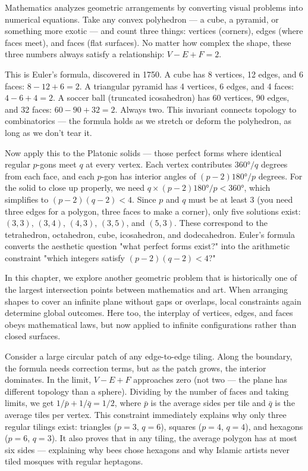 Mathematics analyzes geometric arrangements by converting visual problems into numerical equations. Take any convex polyhedron — a cube, a pyramid, or something more exotic — and count three things: vertices (corners), edges (where faces meet), and faces (flat surfaces). No matter how complex the shape, these three numbers always satisfy a relationship: $V - E + F = 2$.

This is Euler's formula, discovered in 1750. A cube has 8 vertices, 12 edges, and 6 faces: $8 - 12 + 6 = 2$. A triangular pyramid has 4 vertices, 6 edges, and 4 faces: $4 - 6 + 4 = 2$. A soccer ball (truncated icosahedron) has 60 vertices, 90 edges, and 32 faces: $60 - 90 + 32 = 2$. Always two. This invariant connects topology to combinatorics — the formula holds as we stretch or deform the polyhedron, as long as we don't tear it.

Now apply this to the Platonic solids — those perfect forms where identical regular $p$-gons meet $q$ at every vertex. Each vertex contributes $360°/q$ degrees from each face, and each $p$-gon has interior angles of $(p-2)180°/p$ degrees. For the solid to close up properly, we need $q × (p-2)180°/p < 360°$, which simplifies to $(p-2)(q-2) < 4$. Since $p$ and $q$ must be at least 3 (you need three edges for a polygon, three faces to make a corner), only five solutions exist: $(3,3)$, $(3,4)$, $(4,3)$, $(3,5)$, and $(5,3)$. These correspond to the tetrahedron, octahedron, cube, icosahedron, and dodecahedron. Euler's formula converts the aesthetic question "what perfect forms exist?" into the arithmetic constraint "which integers satisfy $(p-2)(q-2) < 4$?"

In this chapter, we explore another geometric problem that is historically one of the largest intersection points between mathematics and art. When arranging shapes to cover an infinite plane without gaps or overlaps, local constraints again determine global outcomes. Here too, the interplay of vertices, edges, and faces obeys mathematical laws, but now applied to infinite configurations rather than closed surfaces.

Consider a large circular patch of any edge-to-edge tiling. Along the boundary, the formula needs correction terms, but as the patch grows, the interior dominates. In the limit, $V - E + F$ approaches zero (not two — the plane has different topology than a sphere). Dividing by the number of faces and taking limits, we get $1/\bar{p} + 1/\bar{q} = 1/2$, where $\bar{p}$ is the average sides per tile and $\bar{q}$ is the average tiles per vertex. This constraint immediately explains why only three regular tilings exist: triangles ($p=3$, $q=6$), squares ($p=4$, $q=4$), and hexagons ($p=6$, $q=3$). It also proves that in any tiling, the average polygon has at most six sides — explaining why bees chose hexagons and why Islamic artists never tiled mosques with regular heptagons.

